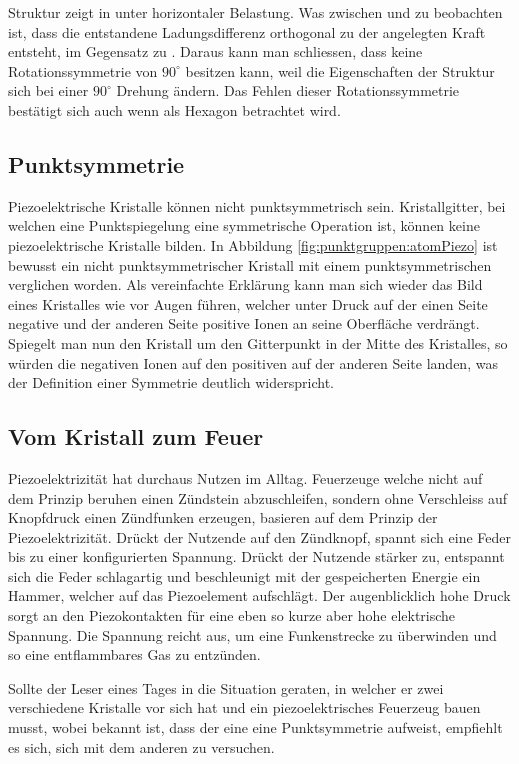 Struktur  zeigt  in unter horizontaler Belastung.
Was zwischen  und  zu beobachten ist, dass die entstandene Ladungsdifferenz orthogonal zu der angelegten Kraft entsteht, im Gegensatz zu .
Daraus kann man schliessen, dass  keine Rotationssymmetrie von \(90^\circ\) besitzen kann, weil die Eigenschaften der Struktur sich bei einer \(90^\circ\) Drehung ändern.
Das Fehlen dieser Rotationssymmetrie bestätigt sich auch wenn  als Hexagon betrachtet wird.
 

\subsection{Punktsymmetrie}

Piezoelektrische Kristalle können nicht punktsymmetrisch sein.
Kristallgitter, bei welchen eine Punktspiegelung eine symmetrische Operation ist, können keine piezoelektrische Kristalle bilden.
In Abbildung \ref{fig:punktgruppen:atomPiezo} ist bewusst  ein nicht punktsymmetrischer Kristall mit einem punktsymmetrischen  verglichen worden.
Als vereinfachte Erklärung kann man sich wieder das Bild eines Kristalles wie  vor Augen führen, welcher unter Druck auf der einen Seite negative und der anderen Seite positive Ionen an seine Oberfläche verdrängt.
Spiegelt man nun den Kristall um den Gitterpunkt in der Mitte des Kristalles, so würden die negativen Ionen auf den positiven auf der anderen Seite landen, was der Definition einer Symmetrie deutlich widerspricht.


\subsection{Vom Kristall zum Feuer}

Piezoelektrizität hat durchaus Nutzen im Alltag.
Feuerzeuge welche nicht auf dem Prinzip beruhen einen Zündstein abzuschleifen, sondern ohne Verschleiss auf Knopfdruck einen Zündfunken erzeugen, basieren auf dem Prinzip der Piezoelektrizität.
%
Drückt der Nutzende auf den Zündknopf, spannt sich eine Feder bis zu einer konfigurierten Spannung.
Drückt der Nutzende stärker zu, entspannt sich die Feder schlagartig und beschleunigt mit der gespeicherten Energie ein Hammer, welcher auf das Piezoelement aufschlägt.
Der augenblicklich hohe Druck sorgt an den Piezokontakten für eine eben so kurze aber hohe elektrische Spannung.
Die Spannung reicht aus, um eine Funkenstrecke zu überwinden und so eine entflammbares Gas zu entzünden.

Sollte der Leser eines Tages in die Situation geraten, in welcher er zwei verschiedene Kristalle vor sich hat und ein piezoelektrisches Feuerzeug bauen musst, wobei bekannt ist, dass der eine eine Punktsymmetrie aufweist, empfiehlt es sich, sich mit dem anderen zu versuchen.

